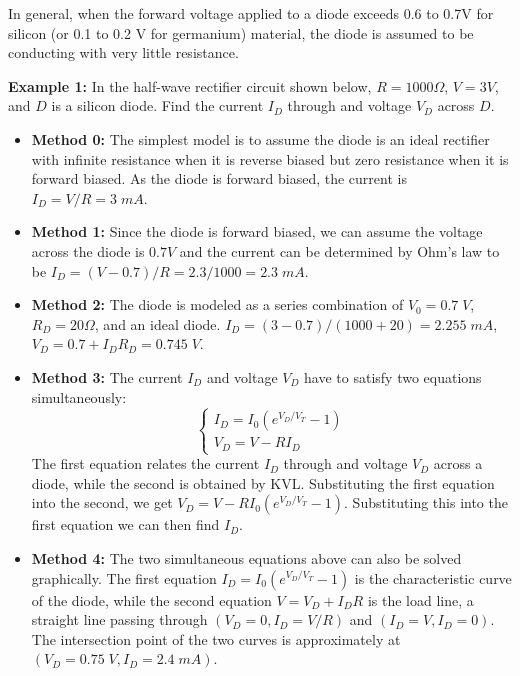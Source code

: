 
In general, when the forward voltage applied to a diode exceeds 0.6 to 
0.7V for silicon (or 0.1 to 0.2 V for germanium) material, the diode is 
assumed to be conducting with very little resistance.

{\bf Example 1: } In the half-wave rectifier circuit shown below, 
$R=1000\Omega$, $V=3V$, and $D$ is a silicon diode. Find the current
$I_D$ through and voltage $V_D$ across $D$.


\begin{itemize}

\item {\bf Method 0:} The simplest model is to assume the diode is an ideal
  rectifier with infinite resistance when it is reverse biased but zero
  resistance when it is forward biased. As the diode is forward biased,
  the current is $I_D=V/R=3\;mA$.

\item {\bf Method 1: } Since the diode is forward biased, we can assume 
  the voltage across the diode is $0.7V$ and the current can be determined 
  by Ohm's law to be $I_D=(V-0.7)/R=2.3/1000=2.3\;mA$.

\item {\bf Method 2: } The diode is modeled as a series combination of
  $V_0=0.7\;V$, $R_D=20\Omega$, and an ideal diode. $I_D=(3-0.7)/(1000+20)=2.255\;mA$,
  $V_D=0.7+I_DR_D=0.745\;V$.

\item {\bf Method 3: } The current $I_D$ and voltage $V_D$ have to satisfy 
  two equations simultaneously:
  \[
  \left\{ \begin{array}{l} I_D=I_0(e^{V_D/V_T}-1) \\
    V_D=V-RI_D \end{array} \right. 
  \]
  The first equation relates the current $I_D$ through and voltage $V_D$ 
  across a diode, while the second is obtained by KVL. Substituting the first
  equation into the second, we get $V_D=V-RI_0(e^{V_D/V_T}-1)$. Substituting
  this into the first equation we can then find $I_D$.

\item {\bf Method 4: } The two simultaneous equations above can also be
  solved graphically. The first equation $I_D=I_0(e^{V_D/V_T}-1)$ is the
  characteristic curve of the diode, while the second equation $V=V_D+I_DR$
  is the load line, a straight line passing through $(V_D=0, I_D=V/R)$ and 
  $(I_D=V, I_D=0)$. The intersection point of the two curves is approximately
  at $(V_D=0.75\;V, I_D=2.4\;mA)$.

\end{itemize}

